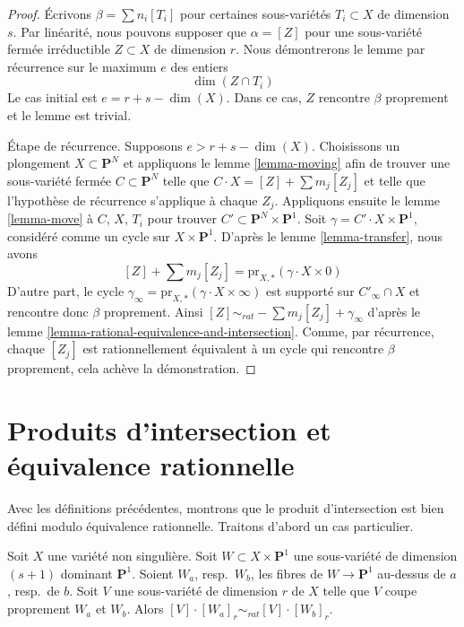 \begin{proof}
Écrivons $\beta = \sum n_i[T_i]$ pour certaines sous-variétés $T_i \subset X$
de dimension $s$. Par linéarité, nous pouvons supposer que $\alpha = [Z]$ pour
une sous-variété fermée irréductible $Z \subset X$ de dimension $r$.
Nous démontrerons le lemme par récurrence sur le maximum $e$ des entiers
$$
\dim(Z \cap T_i)
$$
Le cas initial est $e = r + s - \dim(X)$. Dans ce cas, $Z$ rencontre
$\beta$ proprement et le lemme est trivial.

\medskip\noindent
Étape de récurrence. Supposons $e > r + s - \dim(X)$. Choisissons un plongement
$X \subset \mathbf{P}^N$ et appliquons le lemme \ref{lemma-moving} afin de trouver une
sous-variété fermée $C \subset \mathbf{P}^N$ telle que
$C \cdot X = [Z] + \sum m_j[Z_j]$ et telle que l'hypothèse de
récurrence s'applique à chaque $Z_j$. Appliquons ensuite le lemme \ref{lemma-move}
à $C$, $X$, $T_i$ pour trouver $C' \subset \mathbf{P}^N \times \mathbf{P}^1$.
Soit $\gamma = C' \cdot X \times \mathbf{P}^1$, considéré comme un cycle
sur $X \times \mathbf{P}^1$. D'après le lemme \ref{lemma-transfer}, nous avons
$$
[Z] + \sum m_j[Z_j] = \text{pr}_{X, *}(\gamma \cdot X \times 0)
$$
D'autre part, le cycle
$\gamma_\infty = \text{pr}_{X, *}(\gamma \cdot X \times \infty)$
est supporté sur $C'_\infty \cap X$ et rencontre donc $\beta$ proprement.
Ainsi $[Z] \sim_{rat} - \sum m_j[Z_j] + \gamma_\infty$
d'après le lemme \ref{lemma-rational-equivalence-and-intersection}. Comme, par
récurrence, chaque $[Z_j]$ est rationnellement équivalent à un cycle qui rencontre
$\beta$ proprement, cela achève la démonstration.
\end{proof}



\section{Produits d'intersection et équivalence rationnelle}
\label{section-intersections-and-rational-equivalence}

\noindent
Avec les définitions précédentes, montrons que le produit d'intersection
est bien défini modulo équivalence rationnelle. Traitons d'abord un
cas particulier.

\begin{lemma}
\label{lemma-well-defined-special-case}
Soit $X$ une variété non singulière. Soit
$W \subset X \times \mathbf{P}^1$ une sous-variété de dimension $(s + 1)$
dominant $\mathbf{P}^1$. Soient $W_a$, resp.\ $W_b$, les fibres de
$W \to \mathbf{P}^1$ au-dessus de $a$, resp.\ de $b$. Soit $V$ une sous-variété de dimension $r$
de $X$ telle que $V$ coupe proprement $W_a$ et
$W_b$. Alors $[V] \cdot [W_a]_r \sim_{rat} [V] \cdot [W_b]_r$.
\end{lemma}

